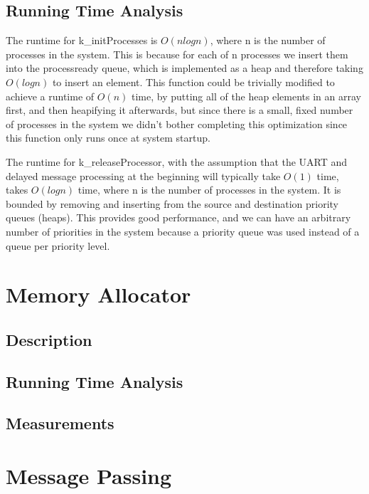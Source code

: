 \documentclass[12pt]{report}
\begin{document}
\section{Running Time Analysis}
The runtime for k\_initProcesses is $O(nlogn)$, where n is the number of
processes in the system. This is because for each of n processes we insert them
into the process\-ready queue, which is implemented as a heap and therefore
taking $O(logn)$ to insert an element. This function could be trivially
modified to achieve a runtime of $O(n)$ time, by putting all of the heap
elements in an array first, and then heapifying it afterwards, but since there
is a small, fixed number of processes in the system we didn't bother completing
this optimization since this function only runs once at system startup.

The runtime for k\_releaseProcessor, with the assumption that the UART and
delayed message processing at the beginning will typically take $O(1)$ time,
takes $O(log n)$ time, where n is the number of processes in the system. It is
bounded by removing and inserting from the source and destination priority
queues (heaps). This provides good performance, and we can have an arbitrary
number of priorities in the system because a priority queue was used instead of
a queue per priority level.

\chapter{Memory Allocator}

\section{Description}

\section{Running Time Analysis}

\section{Measurements}

\chapter{Message Passing}
\end{document}
